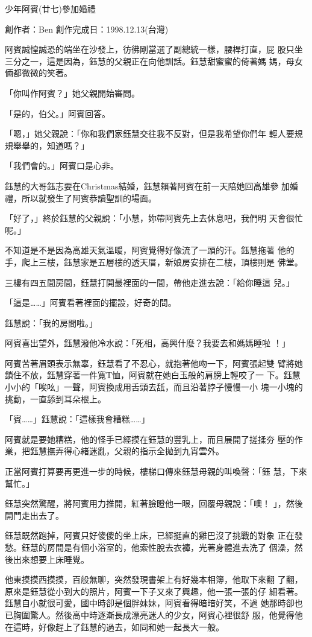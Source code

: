 



少年阿賓(廿七)參加婚禮

創作者：Ben
創作完成日：1998.12.13(台灣)


阿賓誠惶誠恐的端坐在沙發上，彷彿剛當選了副總統一樣，腰桿打直，屁
股只坐三分之一，這是因為，鈺慧的父親正在向他訓話。鈺慧甜蜜蜜的倚著媽
媽，母女倆都微微的笑著。

「你叫作阿賓？」她父親開始審問。

「是的，伯父。」阿賓回答。

「嗯，」她父親說：「你和我們家鈺慧交往我不反對，但是我希望你們年
輕人要規規舉舉的，知道嗎？」

「我們會的。」阿賓口是心非。

鈺慧的大哥鈺志要在Christmas結婚，鈺慧賴著阿賓在前一天陪她回高雄參
加婚禮，所以就發生了阿賓恭讀聖訓的場面。

「好了，」終於鈺慧的父親說：「小慧，妳帶阿賓先上去休息吧，我們明
天會很忙呢。」

不知道是不是因為高雄天氣溫暖，阿賓覺得好像流了一頭的汗。鈺慧拖著
他的手，爬上三樓，鈺慧家是五層樓的透天厝，新娘房安排在二樓，頂樓則是
佛堂。

三樓有四五間房間，鈺慧打開最裡面的一間，帶他走進去說：「給你睡這
兒。」

「這是……」阿賓看著裡面的擺設，好奇的問。

鈺慧說：「我的房間啦。」

阿賓喜出望外，鈺慧潑他冷水說：「死相，高興什麼？我要去和媽媽睡啦
！」

阿賓苦著眉頭表示無辜，鈺慧看了不忍心，就抱著他吻一下，阿賓張起雙
臂將她鎖住不放，鈺慧穿著一件寬T恤，阿賓就在她白玉般的肩膀上輕咬了一
下。鈺慧小小的「唉吆」一聲，阿賓換成用舌頭去舐，而且沿著脖子慢慢一小
塊一小塊的挑動，一直舔到耳朵根上。

「賓……」鈺慧說：「這樣我會糟糕……」

阿賓就是要她糟糕，他的怪手已經摸在鈺慧的豐乳上，而且展開了搓揉夯
壓的作業，把鈺慧撫弄得心緒迷亂，父親的指示全拋到九宵雲外。

正當阿賓打算要再更進一步的時候，樓梯口傳來鈺慧母親的叫喚聲：「鈺
慧，下來幫忙。」

鈺慧突然驚醒，將阿賓用力推開，紅著臉瞪他一眼，回覆母親說：「噢！
」，然後開門走出去了。

鈺慧既然跑掉，阿賓只好傻傻的坐上床，已經挺直的雞巴沒了挑戰的對象
正在發愁。鈺慧的房間是有個小浴室的，他索性脫去衣褲，光著身體進去洗了
個澡，然後出來想要上床睡覺。

他東摸摸西摸摸，百般無聊，突然發現書架上有好幾本相簿，他取下來翻
了翻，原來是鈺慧從小到大的照片，阿賓一下子又來了興趣，他一張一張的仔
細看著。鈺慧自小就很可愛，國中時卻是個胖妹妹，阿賓看得暗暗好笑，不過
她那時卻也已胸圍驚人。然後高中時逐漸長成漂亮迷人的少女，阿賓心裡很舒
服，他覺得他在這時，好像趕上了鈺慧的過去，如同和她一起長大一般。

